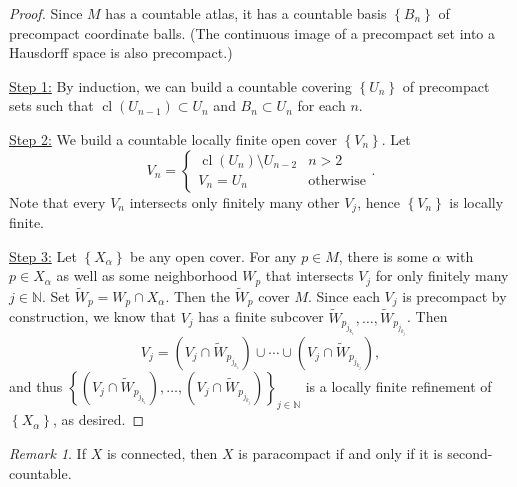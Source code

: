 \documentclass[10pt,letterpaper,cm]{nupset}
\theoremstyle{definition}
\theoremstyle{theorem}
\theoremstyle{remark}
\newtheorem{remark}[definition]{Remark}
\newcommand{\N}{\mathbb N}
\newcommand{\1}{\mathbf{1}}
\newcommand{\0}{\vec 0}
\DeclareMathOperator{\cl}{cl}
\begin{document}
\begin{proof}
Since $M$ has a countable atlas, it has a countable basis $\left\{B_n\right\}$ of precompact coordinate balls. (The continuous image of a precompact set into a Hausdorff space is also precompact.)

\medskip


\underline{Step 1:} By induction, we can build a countable covering $\left\{U_n\right\}$ of precompact sets such that $\cl(U_{n-1}) \subset U_n$ and $B_n \subset U_n$ for each $n$.

\medskip


\underline{Step 2:} We build a countable locally finite open cover $\left\{V_n\right\}$. Let 
\[
V_n = \begin{cases}
\cl(U_n) \setminus U_{n-2} & n > 2
\\ V_n = U_n &  \text{otherwise}
\end{cases}.
\] Note that every $V_n$ intersects only finitely many other $V_j$, hence $\left\{V_n\right\}$ is locally finite.

\medskip


\underline{Step 3:} Let $\left\{X_\alpha\right\}$ be any open cover. For any $p \in M$, there is some $\alpha$ with $p\in X_\alpha$ as well as some neighborhood $W_p$ that intersects $V_j$ for only finitely many  $j\in \N$. Set $\widetilde{W}_p = W_p \cap X_\alpha$. Then the $\widetilde{W}_p$ cover $M$. Since each $V_j$ is precompact by construction, we know that $V_j$ has a finite subcover $\widetilde{W}_{p_{j_{k_1}}}, \ldots, \widetilde{W}_{p_{j_{k_j}}}$. Then $$V_j = \left(V_j \cap \widetilde{W}_{p_{j_{k_1}}}\right) \cup \cdots \cup \left(V_j \cap \widetilde{W}_{p_{j_{k_j}}}\right),$$ and thus $\left\{\left(V_j \cap \widetilde{W}_{p_{j_{k_1}}}\right), \ldots, \left(V_j \cap \widetilde{W}_{p_{j_{k_j}}}\right)\right\}_{j \in \N}$ is a locally finite refinement of $\left\{X_\alpha\right\}$, as desired.
\end{proof}

\begin{remark}
If $X$ is connected, then $X$ is paracompact if and only if it is second-countable.  
\end{remark}
\end{document}
